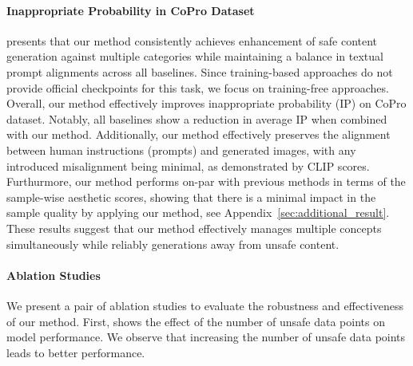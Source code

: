 


\paragraph{Inappropriate Probability in CoPro Dataset}

 presents that our method consistently achieves enhancement of safe content generation against multiple categories while maintaining a balance in textual prompt alignments across all baselines. Since training-based approaches do not provide official checkpoints for this task, we focus on training-free approaches. Overall, our method effectively improves inappropriate probability (IP) on CoPro dataset. Notably, all baselines show a reduction in average IP when combined with our method. Additionally, our method effectively preserves the alignment between human instructions (prompts) and generated images, with any introduced misalignment being minimal, as demonstrated by CLIP scores. Furthurmore, our method performs on-par with previous methods in terms of the sample-wise aesthetic scores, showing that there is a minimal impact in the sample quality by applying our method, see Appendix~\ref{sec:additional_result}. %
These results suggest that our method effectively manages multiple concepts simultaneously while reliably generations away from unsafe content.

\paragraph{Ablation Studies} 

We present a pair of ablation studies to evaluate the robustness and effectiveness of our method. First,  shows the effect of the number of unsafe data points on model performance. We observe that increasing the number of unsafe data points leads to better performance. %

